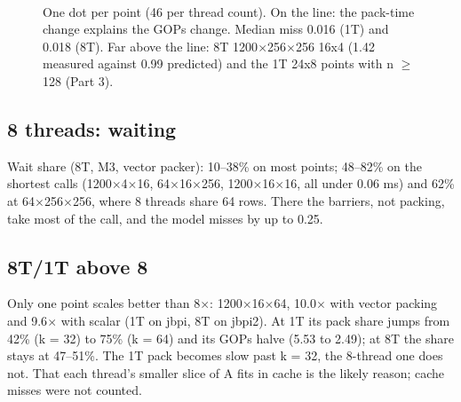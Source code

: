 \documentclass[10pt,a4paper]{article}
\begin{document}
\begin{figure}[htbp]\centering
{}\\[2pt]
{\footnotesize\color{muted} One dot per point (46 per thread count). On the line: the pack-time change explains the GOPs change. Median miss 0.016 (1T) and 0.018 (8T). Far above the line: 8T 1200$\times$256$\times$256 16x4 (1.42 measured against 0.99 predicted) and the 1T 24x8 points with n $\ge$ 128 (Part 3).}
\end{figure}

\subsection*{8 threads: waiting}
Wait share (8T, M3, vector packer): 10--38\% on most points; 48--82\% on the shortest calls (1200$\times$4$\times$16, 64$\times$16$\times$256, 1200$\times$16$\times$16, all under 0.06 ms) and 62\% at 64$\times$256$\times$256, where 8 threads share 64 rows. There the barriers, not packing, take most of the call, and the model misses by up to 0.25.

\subsection*{8T/1T above 8}
Only one point scales better than 8$\times$: 1200$\times$16$\times$64, 10.0$\times$ with vector packing and 9.6$\times$ with scalar (1T on jbpi, 8T on jbpi2). At 1T its pack share jumps from 42\% (k = 32) to 75\% (k = 64) and its GOPs halve (5.53 to 2.49); at 8T the share stays at 47--51\%. The 1T pack becomes slow past k = 32, the 8-thread one does not. That each thread's smaller slice of A fits in cache is the likely reason; cache misses were not counted.
\end{document}
